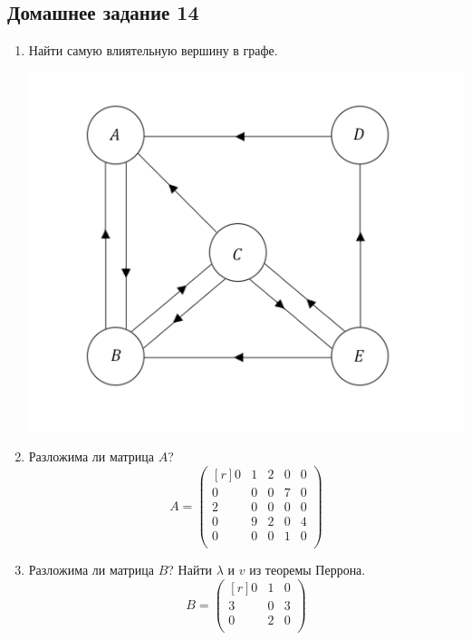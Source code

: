\subsection{Домашнее задание 14}\begin{enumerate}
    \item Найти самую влиятельную вершину в графе.
    \begin{center}
        \includegraphics[scale=0.35]{l14_5_.png}\\
    \end{center}
    \item Разложима ли матрица $A$?
    \[A = \begin{pmatrix}[r]
    0 & 1 & 2 & 0 & 0\\
    0 & 0 & 0 & 7 & 0\\
    2 & 0 & 0 & 0 & 0\\
    0 & 9 & 2 & 0 & 4\\
    0 & 0 & 0 & 1 & 0\\
    \end{pmatrix}\]
    \item Разложима ли матрица $B$? Найти $\lambda$ и $v$ из теоремы Перрона.
    \[B = \begin{pmatrix}[r]
    0 & 1 & 0\\
    3 & 0 & 3\\
    0 & 2 & 0\\
    \end{pmatrix}\]
\end{enumerate}
